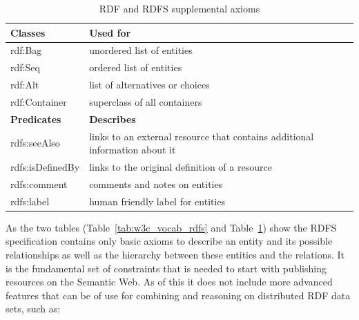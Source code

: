 \begin{table}[H]
\centering
\begin{tabular}{p{5cm}p{7cm}}
\hline
\textbf{Classes} & \textbf{Used for} \\
\hline
rdf:Bag & unordered list of entities \\
\hline
rdf:Seq & ordered list of entities \\
\hline
rdf:Alt & list of alternatives or choices \\
\hline
rdf:Container & superclass of all containers \\
\hline
\textbf{Predicates} & \textbf{Describes} \\
\hline
rdfs:seeAlso &	links to an external resource that contains additional information about it \\
\hline
rdfs:isDefinedBy & links to the original definition of a resource \\
\hline
rdfs:comment & comments and notes on entities \\
\hline
rdfs:label & human friendly label for entities \\
\hline
\end{tabular}
\caption[\gls{RDF} and \gls{RDFS} supplemental axioms]{\gls{RDF} and \gls{RDFS} supplemental axioms \citep[pg. 46-49]{antoniou2012semantic}}
\label{tab:w3c_vocab_supplement}
\end{table}

As the two tables (Table~\ref{tab:w3c_vocab_rdfs} and Table~\ref{tab:w3c_vocab_supplement}) show the \gls{RDFS} specification contains only basic axioms to describe an entity and its possible relationships as well as the hierarchy between these entities and the relations. It is the fundamental set of constraints that is needed to start with publishing resources on the Semantic Web. As of this it does not include more advanced features that can be of use for combining and reasoning on distributed \gls{RDF} data sets, such as: \@

